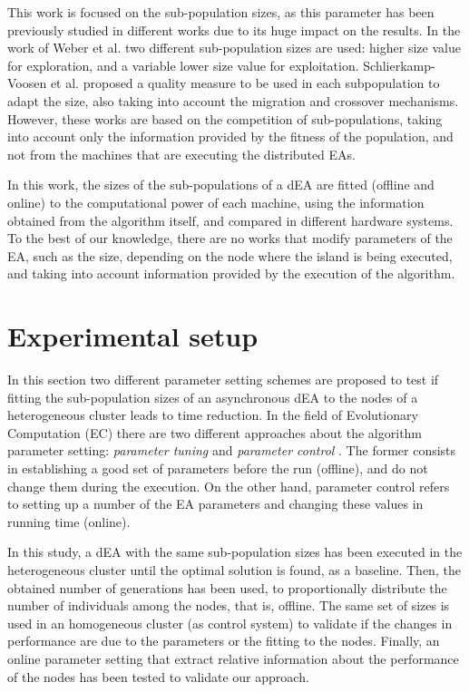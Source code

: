 \documentclass[final,1p,times]{elsarticle}
\begin{document}
This work is focused on the sub-population sizes, as this parameter has been previously studied in different works due to its huge impact on the results. In the work of Weber et al. \cite{DifferentialWeber09} two different sub-population sizes are used: higher size value for exploration, and a variable lower size value for exploitation. Schlierkamp-Voosen et al. \cite{AdaptationSizesSchlierkamp96} proposed a quality measure to be used in each subpopulation to adapt the size, also taking into account the migration and crossover mechanisms. However, these works are based on the competition of sub-populations, taking into account only the information provided by the fitness of the population, and not from the machines that are executing the distributed EAs.


In this work, the sizes of the sub-populations of a dEA are fitted (offline and online) to the computational power of each machine, using the information obtained from the algorithm itself, and compared in different hardware systems.
 To the best of our knowledge, there are no works that
 modify parameters of the EA, such as the size, depending on the
 node where the island is being executed, and taking into account information provided by the execution of the algorithm. 


 


\section{Experimental setup}
\label{sec:experiments}
In this section two different parameter setting schemes are proposed to test if fitting the sub-population sizes of an asynchronous dEA to the nodes of a  heterogeneous cluster leads to time reduction. In the field of  Evolutionary Computation (EC) there are two different approaches about the algorithm parameter setting: {\em parameter tuning} and {\em parameter control} \cite{PARAMETERTUNING}. The former consists in establishing a good set of parameters before the run (offline), and do not change them during the execution. On the other hand, parameter control refers to setting up a number of  the EA parameters  and changing these values in running time (online). 

In this study, a dEA with the same sub-population sizes  has been executed in the heterogeneous cluster until the optimal solution is found, as a baseline. Then, the obtained number of generations has been used, to proportionally distribute the number of individuals among the nodes, that is, offline. The same set of sizes is used in an homogeneous cluster (as control system) to validate if the changes in performance are due to the parameters or the fitting to the nodes. Finally, an online parameter setting that extract relative information about the performance of the nodes has been tested to validate our approach. 
\end{document}
